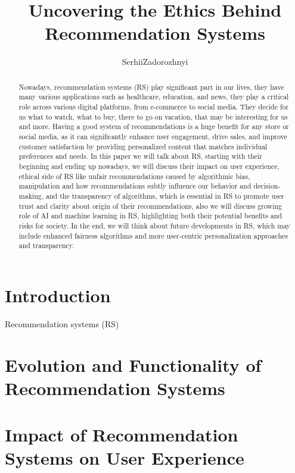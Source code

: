 \documentclass{article}
\title{Uncovering the Ethics Behind Recommendation Systems}
\author{Serhii\;Zadorozhnyi}
\begin{document}
\maketitle
\textbf{}

\begin{abstract}
Nowadays, recommendation systems (RS) play significant part in our lives, they have many various applications such as healthcare, education, and news, they play a critical role across various digital platforms, from e-commerce to social media. They decide for us what to watch, what to buy, there to go on vacation, that may be interesting for us and more. Having a good system of recommendations is a huge benefit for any store or social media, as it can significantly enhance user engagement, drive sales, and improve customer satisfaction by providing personalized content that matches individual preferences and needs. In this paper we will talk about RS, starting with their beginning and ending up nowadays, we will discuss their impact on user experience, ethical side of RS like unfair recommendations caused by algorithmic bias, manipulation and how recommendations subtly influence our behavior and decision-making, and the transparency of algorithms, which is essential in RS to promote user trust and clarity about origin of their recommendations, also we will discuss growing role of AI and machine learning in RS, highlighting both their potential benefits and risks for society. In the end, we will think about future developments in RS, which may include enhanced fairness algorithms and more user-centric personalization approaches and transparency.
\end{abstract}


\section{Introduction}
Recommendation systems (RS) 
\section{Evolution and Functionality of Recommendation Systems}
\section{Impact of Recommendation Systems on User Experience}
\end{document}
